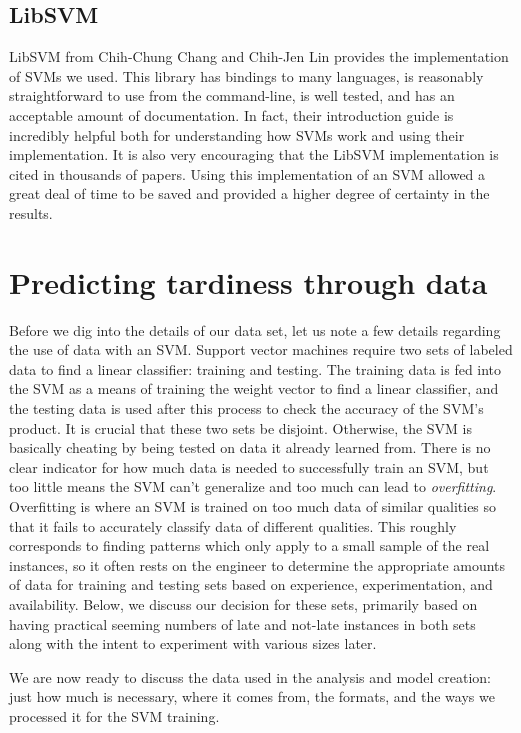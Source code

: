 \documentclass[11pt]{article} %
\begin{document}
\subsection{LibSVM}
\label{sec:libsvm}
LibSVM \cite{chang2011libsvm} from Chih-Chung Chang and Chih-Jen Lin provides the
implementation of SVMs we used.  This library has bindings to many languages, is 
reasonably straightforward to use from the command-line, is well tested, and has an 
acceptable amount of documentation. In fact, their introduction guide 
\cite{chang2011libsvm} is incredibly helpful both for understanding how SVMs work
and using their implementation. It is also very encouraging that the LibSVM 
implementation is cited in thousands of papers.  Using this implementation of an 
SVM allowed a great deal of time to be saved and provided a higher degree of 
certainty in the results.

\section{Predicting tardiness through data}
\label{sec:problem}
Before we dig into the details of our data set, let us note a few details regarding
the use of data with an SVM.  
Support vector machines require two sets of labeled data to find a linear classifier:
training and testing. The training data is fed into the SVM as a means of training
the weight vector to find a linear classifier, and the testing data is used
after this process to check the accuracy of the SVM's product.  It is crucial that
these two sets be disjoint. Otherwise, the SVM is basically cheating by being
tested on data it already learned from. There is no clear indicator for how much data
is needed to successfully train an SVM, but too little means the SVM can't 
generalize and too much can lead to \textit{overfitting}. Overfitting is where an 
SVM is trained on too much data of similar qualities so that it fails to accurately
classify data of different qualities. This roughly corresponds to finding patterns
which only apply to a small sample of the real instances, so it often rests 
on the engineer to determine the appropriate amounts of data for training
and testing sets based on experience, experimentation, and availability. Below,
we discuss our decision for these sets, primarily based on having practical
seeming numbers of late and not-late instances in both sets along with the intent
to experiment with various sizes later.

We are now ready to discuss the data used in the analysis and model creation: 
just how much is necessary, where it comes from, the formats, and the ways we
processed it for the SVM training.
\end{document}

